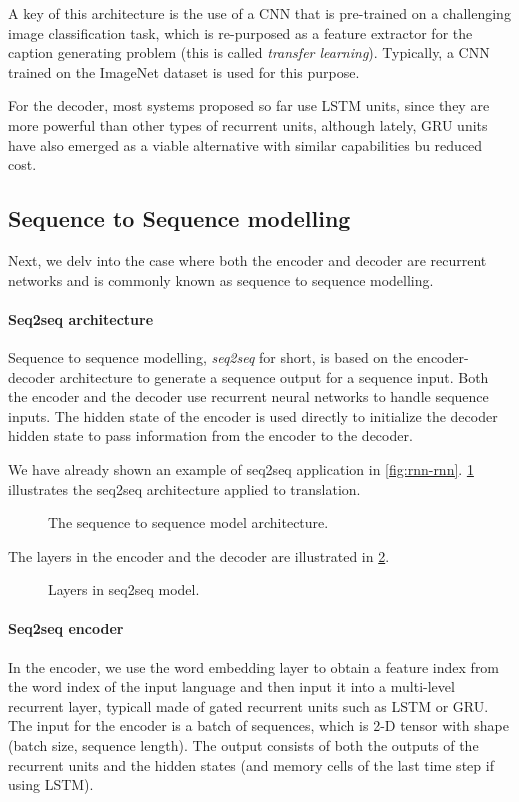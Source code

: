 A key of this architecture is the use of a CNN that is pre-trained on a challenging image classification task, which is re-purposed as a feature extractor for the caption generating problem (this is called \textit{transfer learning}). Typically, a CNN trained on the ImageNet dataset is used for this purpose.

For the decoder, most systems proposed so far use LSTM units, since they are more powerful than other types of recurrent units, although lately, GRU units have also emerged as a viable alternative with similar capabilities bu reduced cost.

\subsection{Sequence to Sequence  modelling}\label{subsec:seq2seq}

Next, we delv into the case where both the encoder and decoder are recurrent networks and is commonly known as sequence to sequence modelling.

\paragraph{Seq2seq architecture}
Sequence to sequence modelling, \textit{seq2seq} for short, is based on the encoder-decoder architecture to generate a sequence output for a sequence input. Both the encoder and the decoder use recurrent neural networks to handle sequence inputs. The hidden state of the encoder is used directly to initialize the decoder hidden state to pass information from the encoder to the decoder.

We have already shown an example of seq2seq application in \cref{fig:rnn-rnn}. \cref{fig:seq2seq} illustrates the seq2seq architecture applied to translation.

\begin{figure}[hpt]
	\centering
	
	\caption{The sequence to sequence model architecture.}
	\label{fig:seq2seq}
\end{figure}

The layers in the encoder and the decoder are illustrated in \cref{fig:seq2seq_details}.

\begin{figure}[hpt]
	\centering
	
	\caption{Layers in seq2seq model.}
	\label{fig:seq2seq_details}
\end{figure}

\paragraph{Seq2seq encoder}
In the encoder, we use the word embedding layer to obtain a feature index from the word index of the input language and then input it into a multi-level recurrent layer, typicall made of gated recurrent units such as LSTM or GRU. The input for the encoder is a batch of sequences, which is 2-D tensor with shape (batch size, sequence length). The output consists of both the outputs of the recurrent units and the hidden states (and memory cells of the last time step if using LSTM).

